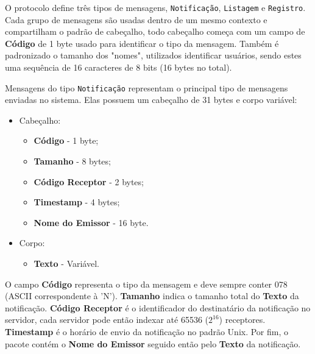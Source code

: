 \documentclass[12pt]{article}
\begin{document}
O protocolo define três tipos de mensagens,
{\tt Notificação}, {\tt Listagem} e {\tt Registro}.
Cada grupo de mensagens são usadas dentro de um mesmo contexto e compartilham o padrão de cabeçalho,
todo cabeçalho começa com um campo de {\bf Código} de 1 byte usado para identificar o tipo da mensagem.
Também é padronizado o tamanho dos "nomes", utilizados identificar usuários,
sendo estes uma sequência de 16 caracteres de 8 bits (16 bytes no total).

Mensagens do tipo {\tt Notificação} representam o principal tipo de mensagens enviadas no sistema.
Elas possuem um cabeçalho de 31 bytes e corpo variável:
\begin{itemize}
\item Cabeçalho:
	\begin{itemize}
	\item {\bf Código} - 1 byte;
	\item {\bf Tamanho} - 8 bytes;
	\item {\bf Código Receptor} - 2 bytes;
	\item {\bf Timestamp} - 4 bytes;
	\item {\bf Nome do Emissor} - 16 byte.
	\end{itemize}
\item Corpo:
	\begin{itemize}
	\item {\bf Texto} - Variável.
	\end{itemize}
\end{itemize}
O campo {\bf Código} representa o tipo da mensagem e deve sempre conter 078 (ASCII correspondente à 'N').
{\bf Tamanho} indica o tamanho total do {\bf Texto} da notificação.
{\bf Código Receptor} é o identificador do destinatário da notificação no servidor,
cada servidor pode então indexar até 65536 ($2^{16}$) receptores.
{\bf Timestamp} é o horário de envio da notificação no padrão Unix.
Por fim, o pacote contém o {\bf Nome do Emissor} seguido então pelo {\bf Texto} da notificação.
\end{document}
